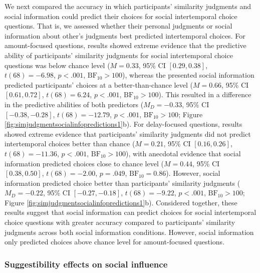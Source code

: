 \documentclass[
  pub,floatsintext]{apa6}
\begin{document}
We next compared the accuracy in which participants' similarity judgments and social information could predict their choices for social intertemporal choice questions. That is, we assessed whether their personal judgments or social information about other's judgments best predicted intertemporal choices. For amount-focused questions, results showed extreme evidence that the predictive ability of participants' similarity judgments for social intertemporal choice questions was below chance level (\(M = 0.33\), 95\% CI \([0.29, 0.38]\), \(t(68) = -6.98\), \(p < .001\), \(\mathrm{BF}_{\textrm{10}} > 100\)), whereas the presented social information predicted participants' choices at a better-than-chance level (\(M = 0.66\), 95\% CI \([0.61, 0.72]\), \(t(68) = 6.24\), \(p < .001\), \(\mathrm{BF}_{\textrm{10}} > 100\)). This resulted in a difference in the predictive abilities of both predictors (\(M_D = -0.33\), 95\% CI \([-0.38, -0.28]\), \(t(68) = -12.79\), \(p < .001\), \(\mathrm{BF}_{\textrm{10}} > 100\); Figure \ref{fig:simjudgmentsocialinfopredictions1}b). For delay-focused questions, results showed extreme evidence that participants' similarity judgments did not predict intertemporal choices better than chance (\(M = 0.21\), 95\% CI \([0.16, 0.26]\), \(t(68) = -11.36\), \(p < .001\), \(\mathrm{BF}_{\textrm{10}} > 100\)), with anecdotal evidence that social information predicted choices close to chance level (\(M = 0.44\), 95\% CI \([0.38, 0.50]\), \(t(68) = -2.00\), \(p = .049\), \(\mathrm{BF}_{\textrm{10}} = 0.86\)). However, social information predicted choice better than participants' similarity judgments (\(M_D = -0.22\), 95\% CI \([-0.27, -0.18]\), \(t(68) = -9.22\), \(p < .001\), \(\mathrm{BF}_{\textrm{10}} > 100\); Figure \ref{fig:simjudgmentsocialinfopredictions1}b). Considered together, these results suggest that social information can predict choices for social intertemporal choice questions with greater accuracy compared to participants' similarity judgments across both social information conditions. However, social information only predicted choices above chance level for amount-focused questions.

\hypertarget{suggestibility-effects-on-social-influence}{%
\subsubsection{Suggestibility effects on social influence}\label{suggestibility-effects-on-social-influence}}
\end{document}
